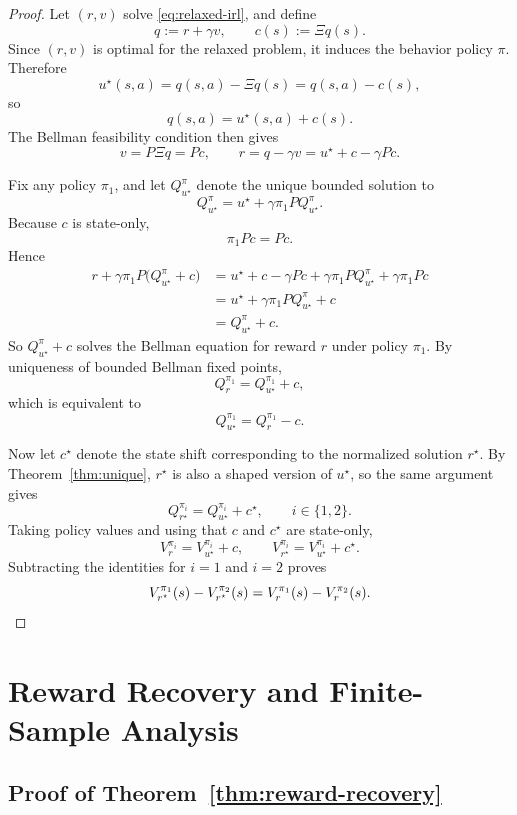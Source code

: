 \documentclass{article}
\newcommand{\1}{\mathbbm{1}}
\begin{document}
\begin{proof}
Let \((r,v)\) solve \eqref{eq:relaxed-irl}, and define
\[
q:=r+\gamma v,
\qquad
c(s):=\Xi q(s).
\]
Since \((r,v)\) is optimal for the relaxed problem, it induces the behavior
policy \(\pi\). Therefore
\[
u^\star(s,a)
=
q(s,a)-\Xi q(s)
=
q(s,a)-c(s),
\]
so
\[
q(s,a)=u^\star(s,a)+c(s).
\]
The Bellman feasibility condition then gives
\[
v=P\Xi q=Pc,
\qquad
r=q-\gamma v=u^\star+c-\gamma Pc.
\]

Fix any policy \(\pi_1\), and let \(Q^\pi_{u^\star}\) denote the unique bounded
solution to
\[
Q^\pi_{u^\star}
=
u^\star+\gamma \pi_1 P Q^\pi_{u^\star}.
\]
Because \(c\) is state-only,
\[
\pi_1 P c = Pc.
\]
Hence
\begin{align*}
r+\gamma \pi_1 P\bigl(Q^\pi_{u^\star}+c\bigr)
&=
u^\star+c-\gamma Pc+\gamma \pi_1 P Q^\pi_{u^\star}+\gamma \pi_1 P c \\
&=
u^\star+\gamma \pi_1 P Q^\pi_{u^\star}+c \\
&=
Q^\pi_{u^\star}+c.
\end{align*}
So \(Q^\pi_{u^\star}+c\) solves the Bellman equation for reward \(r\) under
policy \(\pi_1\). By uniqueness of bounded Bellman fixed points,
\[
Q_r^{\pi_1}=Q_{u^\star}^{\pi_1}+c,
\]
which is equivalent to
\[
Q_{u^\star}^{\pi_1}=Q_r^{\pi_1}-c.
\]

Now let \(c^\star\) denote the state shift corresponding to the normalized
solution \(r^\star\). By Theorem~\ref{thm:unique}, \(r^\star\) is also a shaped
version of \(u^\star\), so the same argument gives
\[
Q_{r^\star}^{\pi_i}=Q_{u^\star}^{\pi_i}+c^\star,
\qquad i\in\{1,2\}.
\]
Taking policy values and using that \(c\) and \(c^\star\) are state-only,
\[
V_r^{\pi_i}
=
V_{u^\star}^{\pi_i}+c,
\qquad
V_{r^\star}^{\pi_i}
=
V_{u^\star}^{\pi_i}+c^\star.
\]
Subtracting the identities for \(i=1\) and \(i=2\) proves
\[
V_{r^\star}^{\pi_1}(s)-V_{r^\star}^{\pi_2}(s)
=
V_r^{\pi_1}(s)-V_r^{\pi_2}(s).
\qedhere
\]
\end{proof}

\section{Reward Recovery and Finite-Sample Analysis}
\label{app:recovery}

\subsection{Proof of Theorem~\ref{thm:reward-recovery}}
\end{document}
